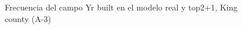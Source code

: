 \begin{figure}[H]
    \centering
    
    \caption{Frecuencia del campo Yr built en el modelo real y top2+1, King county (A-3)}
    \label{frecuency-top2+1-yr built}
\end{figure}
